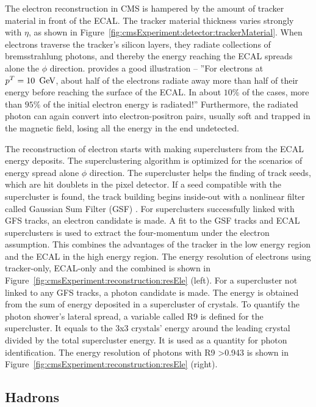 The electron reconstruction in CMS is hampered by the amount of tracker material in front of the ECAL. The tracker material thickness varies strongly with $\eta$, as shown in Figure~\ref{fig:cmsExperiment:detector:trackerMaterial}. When electrons traverse the tracker's silicon layers, they radiate collections of bremsstrahlung photons, and thereby the energy reaching the ECAL spreads alone the $\phi$ direction. \cite{cms:tdr1:Bayatian:2006nff} provides a good illustration -- ''For electrons at $p^T=10~\,\text{Ge\hspace{-.08em}V}$, about half of the electrons radiate away more than half of their energy before reaching the surface of the ECAL. In about $10\%$ of the cases, more than $95\%$ of the initial electron energy is radiated!'' Furthermore, the radiated photon can again convert into electron-positron pairs, usually soft and trapped in the magnetic field, losing all the energy in the end undetected.

The reconstruction of electron starts with making superclusters from the ECAL energy deposits. The superclustering algorithm is optimized for the scenarios of energy spread alone $\phi$ direction. The supercluster helps the finding of track seeds, which are hit doublets in the pixel detector. If a seed compatible with the supercluster is found, the track building begins inside-out with a nonlinear filter called Gaussian Sum Filter (GSF) \cite{tech:gsf:Adam:2005bya}. For superclusters successfully linked with GFS tracks, an electron candidate is made. A fit to the GSF tracks and ECAL superclusters is used to extract the four-momentum under the electron assumption. This combines the advantages of the tracker in the low energy region and the ECAL in the high energy region. The energy resolution of electrons using tracker-only, ECAL-only and the combined is shown in Figure~\ref{fig:cmsExperiment:reconstruction:resEle} (left). For a supercluster not linked to any GFS tracks, a photon candidate is made. The energy is obtained from the sum of energy deposited in a supercluster of crystals. To quantify the photon shower's lateral spread, a variable called R9 is defined for the supercluster. It equals to the 3x3 crystals' energy around the leading crystal divided by the total supercluster energy. It is used as a quantity for photon identification. The energy resolution of photons with R9 >0.943 is shown in Figure~\ref{fig:cmsExperiment:reconstruction:resEle} (right).



\subsection{Hadrons}
\label{sec:cmsExperiment:reconstruction:hadron}

